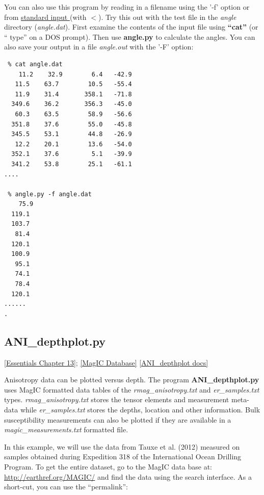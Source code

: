 \documentclass[11pt]{book}
\begin{document}
{ You can also use this program by reading in a filename using the '-f' option or from \href{#standard_IO}{standard input }(with $<$).  Try this out with the test file in the {\it angle} directory ({\it angle.dat}).  First examine the contents of the input file using {\bf ``cat''} (or `` type'' on a DOS prompt).  Then use {\bf angle.py} to calculate the angles.  You can also save your output in a file {\it angle.out} with the '-F' option:

 \begin{verbatim}
 % cat angle.dat
    11.2    32.9 	    6.4   -42.9
   11.5    63.7 	   10.5   -55.4
   11.9    31.4 	  358.1   -71.8
  349.6    36.2 	  356.3   -45.0
   60.3    63.5 	   58.9   -56.6
  351.8    37.6 	   55.0   -45.8
  345.5    53.1 	   44.8   -26.9
   12.2    20.1 	   13.6   -54.0
  352.1    37.6 	    5.1   -39.9
  341.2    53.8 	   25.1   -61.1
....

 % angle.py -f angle.dat
    75.9
  119.1
  103.7
   81.4
  120.1
  100.9
   95.1
   74.1
   78.4
  120.1
......
.
\end{verbatim}


\subsection{ANI\_depthplot.py}
\href{http://earthref.org/MAGIC/books/Tauxe/Essentials/WebBook3ch13.html#ch13}{[Essentials Chapter 13]};
\href{#MagICDatabase}{[MagIC Database]}
\href{https://github.com/PmagPy/PmagPy/blob/master/programs/ANI_depthplot.py}{[ANI\_depthplot docs]}

Anisotropy data can be plotted versus depth.  The program {\bf ANI\_depthplot.py} uses MagIC formatted data tables of the {\it rmag\_anisotropy.txt} and {\it er\_samples.txt} types.  {\it rmag\_anisotropy.txt} stores the tensor elements and measurement meta-data while {\it er\_samples.txt} stores the depths, location and other information.  Bulk susceptibility measurements can also be plotted if they are available in a {\it magic\_measurements.txt} formatted file.

In this example, we will use the data from Tauxe et al. (2012) \nocite{tauxe12} measured on samples obtained during Expedition 318 of the International Ocean Drilling Program.  To get the entire dataset, go to the MagIC data base at:  \url{http://earthref.org/MAGIC/}
and find the data using the search interface.   As a short-cut, you can use the ``permalink'':

}
\end{document}
